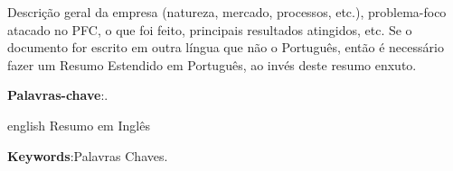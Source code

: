 
\setlength{\absparsep}{18pt} %
\begin{resumo}
Descrição geral da empresa (natureza, mercado, processos, etc.), problema-foco atacado no PFC, o que foi feito, principais resultados atingidos, etc.
Se o documento for escrito em outra língua que não o Português, então é necessário fazer um Resumo Estendido em Português, ao invés deste resumo enxuto.


 \textbf{Palavras-chave}:.
\end{resumo}

\begin{resumo}[Abstract]
 \begin{otherlanguage*}{english}
Resumo em Inglês
   \vspace{\onelineskip}
 
   \noindent 
   \textbf{Keywords}:Palavras Chaves.
 \end{otherlanguage*}
\end{resumo}

% 
%
%  
